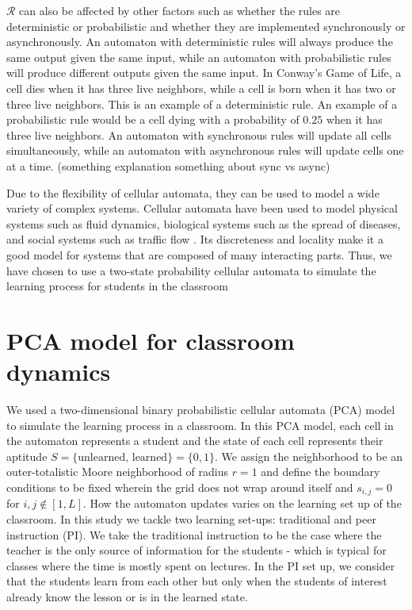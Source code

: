 $\mathcal{R}$ can also be affected by other factors such as whether the rules are deterministic or probabilistic and whether they are implemented synchronously or asynchronously. 
An automaton with deterministic rules will always produce the same output given the same input, while an automaton with probabilistic rules will produce different outputs given the same input. 
In Conway's Game of Life, a cell dies when it has three live neighbors, while a cell is born when it has two or three live neighbors. 
This is an example of a deterministic rule. An example of a probabilistic rule would be a cell dying with a probability of $0.25$ when it has three live neighbors. 
An automaton with synchronous rules will update all cells simultaneously, while an automaton with asynchronous rules will update cells one at a time. 
(something explanation something about sync vs async)


Due to the flexibility of cellular automata, they can be used to model a wide variety of complex systems.
 Cellular automata have been used to model physical systems such as fluid dynamics, biological systems such as the spread of diseases, and social systems such as traffic flow \cite{louis2018probabilistic}.
  Its discreteness and locality make it a good model for systems that are composed of many interacting parts.
   Thus, we have chosen to use a two-state probability cellular automata to simulate the learning process for students in the classroom


\section{PCA model for classroom dynamics}
We used a two-dimensional binary probabilistic cellular automata (PCA) model to simulate the learning process in a classroom. 
In this PCA model, each cell in the automaton represents a student and the state of each cell represents their aptitude $S=\lbrace\text{unlearned, learned}\rbrace=\lbrace 0,1 \rbrace$. 
We assign the neighborhood to be an outer-totalistic Moore neighborhood of radius $r=1$ and define the boundary conditions to be fixed wherein the grid does not wrap around itself and $s_{i,j} = 0$ for ${i,j \notin [1,L]}$. 
How the automaton updates varies on the learning set up of the classroom. In this study we tackle two learning set-ups: traditional and peer instruction (PI). 
We take the traditional instruction to be the case where the teacher is the only source of information for the students - which is typical for classes where the time is mostly spent on lectures. 
In the PI set up, we consider that the students learn from each other but only when the students of interest already know the lesson or is in the learned state.

